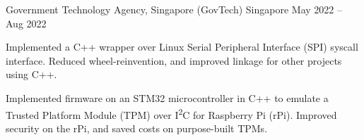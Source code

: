 \begin{cventries}

	{Government Technology Agency, Singapore (GovTech)} %
	{Singapore} %
	{May 2022 -- Aug 2022} %
	{
		\begin{cvitems} %
			\item Implemented a C++ wrapper over Linux Serial Peripheral Interface (SPI) syscall interface. Reduced wheel-reinvention, and improved linkage for other projects using C++.
			\item Implemented firmware on an STM32 microcontroller in C++ to emulate a Trusted Platform Module (TPM) over I\textsuperscript{2}C for Raspberry Pi (rPi). Improved security on the rPi, and saved costs on purpose-built TPMs.
		\end{cvitems}
	}


\end{cventries}
